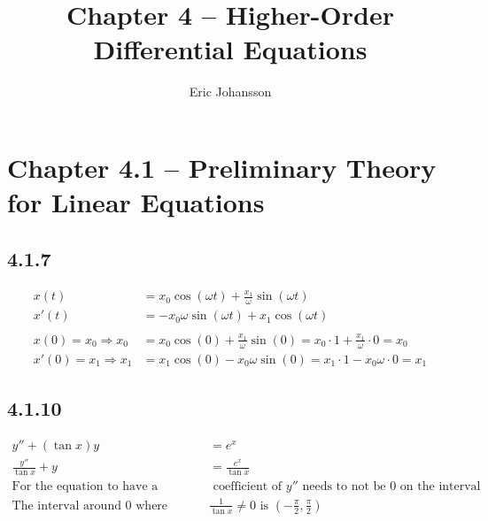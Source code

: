 \documentclass{article}
\title{Chapter 4 -- Higher-Order Differential Equations}
\author{Eric Johansson}
\begin{document}
\maketitle
\tableofcontents
\newpage

\section{Chapter 4.1 -- Preliminary Theory for Linear Equations }


\subsection{4.1.7}
\begin{align*}
    x(t) &= x_0\cos (\omega t)+\frac{x_1}{\omega}\sin (\omega t)\\
    x'(t) &= -x_0 \omega\sin(\omega t)+x_1\cos  (\omega t)\\\\
    x(0)  = x_0 \Rightarrow   x_0   &= x_0\cos (0)+\frac{x_1}{\omega}\sin (0) = x_0\cdot 1+\frac{x_1}{\omega}\cdot 0 = x_0\\
    x'(0)  = x_1 \Rightarrow x_1 &= x_1\cos (0)-x_0\omega\sin (0) = x_1 \cdot 1 - x_0\omega\cdot 0   = x_1
\end{align*}

\subsection{4.1.10}
\begin{align*}
    y''+(\tan x)y &= e^{x}\\
    \frac{y''}{\tan x}+y &= \frac{e^{x}}{\tan x} \\
    \text{For the equation to have a solution the}& \text{ coefficient of \(y''\) needs to not be 0 on the interval}\\
    \text{The interval around 0 where } &\frac{1}{\tan x}\neq 0\text{ is } \left(-\frac{\pi}{2},\frac{\pi}{2}\right)
\end{align*}
\end{document}
